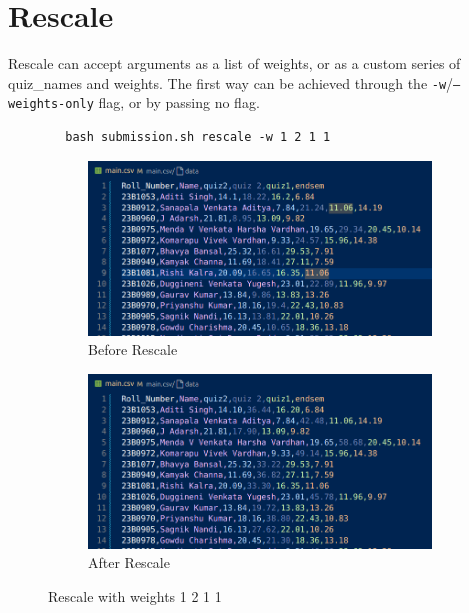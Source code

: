 \documentclass{article}
\begin{document}
    \section{Rescale}
    Rescale can accept arguments as a list of weights, or as a custom series of quiz\_names and weights. The first way can be achieved through the \texttt{-w}/\texttt{--weights-only} flag, or by passing no flag.
    \begin{lstlisting}
        bash submission.sh rescale -w 1 2 1 1
    \end{lstlisting}
    \begin{figure}[htbp]
        \centering
        \begin{subfigure}[b]{0.45\textwidth}
            \centering
            \includegraphics[width=\textwidth]{Before_Rescale}
            \caption{Before Rescale}
            \label{fig:bef_res}
        \end{subfigure}
        \hfill
        \begin{subfigure}[b]{0.45\textwidth}
            \centering
            \includegraphics[width=\textwidth]{After Rescale.png}
            \caption{After Rescale}
            \label{fig:aft_res}
        \end{subfigure}
        \caption{Rescale with weights 1 2 1 1}
        \label{fig:bef_and_aft_rescale}
    \end{figure}
\end{document}
